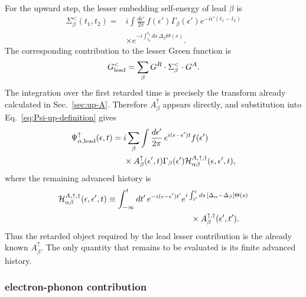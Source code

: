 \documentclass[
 reprint,
 superscriptaddress,
 amsmath,amssymb,
 aps,prb,
 longbibliography,
 floatfix
]{revtex4-2}
\begin{document}
For the upward step, the lesser embedding self-energy of lead $\beta$ is
\begin{equation*}
\begin{aligned}
\Sigma_\beta^<(t_1,t_2)
={}&
i\int\frac{d\epsilon'}{2\pi}\,
f(\epsilon')\Gamma_\beta(\epsilon')
e^{-i\epsilon'(t_1-t_2)}
\\
&\times
e^{-i\int_{t_2}^{t_1}ds\,
\Delta_\beta\Theta(s)} .
\end{aligned}
\end{equation*}
The corresponding contribution to the lesser Green function is
\begin{equation*}
G_{\rm lead}^<
=
\sum_\beta
G^R\cdot\Sigma_\beta^<\cdot G^A.
\end{equation*}
The integration over the first retarded time is precisely the transform already calculated in Sec.~\ref{sec:up-A}. Therefore $A_\beta^\uparrow$ appears directly, and substitution into Eq.~\eqref{eq:Psi-up-definition} gives
\begin{equation}
\begin{aligned}
\Psi_{\alpha,\rm lead}^\uparrow(\epsilon,t)
={}&
i\sum_\beta
\int\frac{d\epsilon'}{2\pi}\,
e^{i(\epsilon-\epsilon')t}
f(\epsilon')
\\
&\times
A_\beta^\uparrow(\epsilon',t)
\Gamma_\beta(\epsilon')
\mathcal H_{\alpha\beta}^{A,\uparrow,\dagger}
(\epsilon,\epsilon',t),
\end{aligned}
\label{eq:Psi-lead-before-B}
\end{equation}
where the remaining advanced history is
\begin{align}
&\mathcal H_{\alpha\beta}^{A,\uparrow,\dagger}
(\epsilon,\epsilon',t)
\equiv
\int_{-\infty}^{t}dt'\,
e^{-i(\epsilon-\epsilon')t'}
e^{i\int_{t'}^t ds\,
[\Delta_\alpha-\Delta_\beta]\Theta(s)} \notag
\\
&\qquad\qquad\qquad\qquad\qquad\qquad\qquad\qquad\times
A_\beta^{\uparrow,\dagger}(\epsilon',t').
\label{eq:H-A-up-def}
\end{align}
Thus the retarded object required by the lead lesser contribution is the already known $A_\beta^\uparrow$. The only quantity that remains to be evaluated is its finite advanced history.

\subsubsection{electron-phonon contribution}
\end{document}
